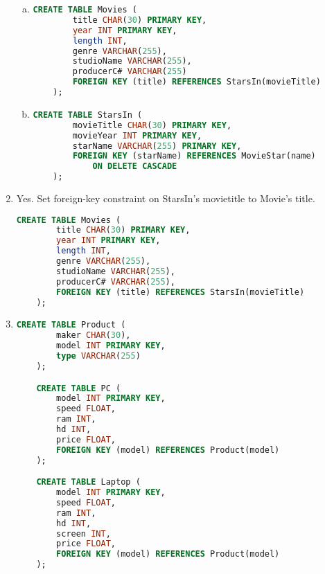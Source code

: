 \documentclass[12pt]{article}
\begin{document}
\begin{enumerate}[1.]
\begin{enumerate}[a)]
        \item

    \begin{lstlisting}[language=SQL]
    CREATE TABLE Movies (
        title CHAR(30) PRIMARY KEY,
        year INT PRIMARY KEY,
        length INT,
        genre VARCHAR(255),
        studioName VARCHAR(255),
        producerC# VARCHAR(255)
        FOREIGN KEY (title) REFERENCES StarsIn(movieTitle)
    );
    \end{lstlisting}

        \item

    \begin{lstlisting}[language=SQL]
    CREATE TABLE StarsIn (
        movieTitle CHAR(30) PRIMARY KEY,
        movieYear INT PRIMARY KEY,
        starName VARCHAR(255) PRIMARY KEY,
        FOREIGN KEY (starName) REFERENCES MovieStar(name)
            ON DELETE CASCADE
    );
    \end{lstlisting}

    \end{enumerate}

    \item Yes. Set foreign-key constraint on StarsIn's movietitle to Movie's title.

    \bigskip

    \begin{lstlisting}[language=SQL]
    CREATE TABLE Movies (
        title CHAR(30) PRIMARY KEY,
        year INT PRIMARY KEY,
        length INT,
        genre VARCHAR(255),
        studioName VARCHAR(255),
        producerC# VARCHAR(255),
        FOREIGN KEY (title) REFERENCES StarsIn(movieTitle)
    );
    \end{lstlisting}

    \item

    \begin{lstlisting}[language=SQL]
    CREATE TABLE Product (
        maker CHAR(30),
        model INT PRIMARY KEY,
        type VARCHAR(255)
    );

    CREATE TABLE PC (
        model INT PRIMARY KEY,
        speed FLOAT,
        ram INT,
        hd INT,
        price FLOAT,
        FOREIGN KEY (model) REFERENCES Product(model)
    );

    CREATE TABLE Laptop (
        model INT PRIMARY KEY,
        speed FLOAT,
        ram INT,
        hd INT,
        screen INT,
        price FLOAT,
        FOREIGN KEY (model) REFERENCES Product(model)
    );


\end{lstlisting}
\end{enumerate}
\end{document}
